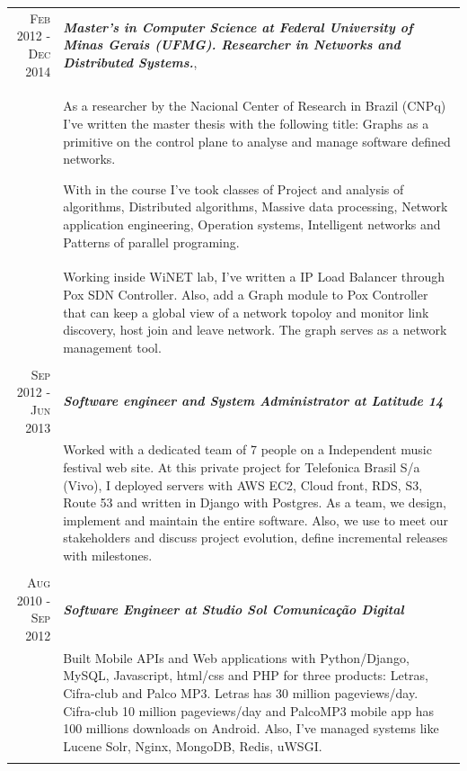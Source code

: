 \documentclass[a4paper,10pt]{article} %
\begin{document}
\begin{longtable}{r|p{11cm}}

\textsc{Feb 2012 - Dec 2014} & \emph{\bf Master's in Computer Science at
Federal University of Minas Gerais (UFMG). Researcher in
Networks and Distributed Systems.}, \\
& \footnotesize{As a researcher by the Nacional Center of Research in Brazil
    (CNPq) I've written the master thesis with the following title: Graphs as
    a primitive on the control plane to analyse and manage software defined
    networks.

    With in the course I've took classes of Project and analysis of algorithms,
    Distributed algorithms, Massive data processing, Network application
    engineering, Operation systems, Intelligent networks and Patterns of
    parallel programing.} \\

& \footnotesize{
    Working inside WiNET lab, I've written a IP Load Balancer through Pox SDN
    Controller. Also, add a Graph module to
    Pox Controller that can keep a global view of a network topoloy and monitor
    link discovery, host join and leave network. The graph serves as a network
    management tool.} \\
\multicolumn{2}{c}{} \\


\textsc{Sep 2012 - Jun 2013} & \emph{\bf Software engineer and System
Administrator at Latitude 14} \\
& \footnotesize{Worked with a dedicated team of 7 people on a Independent
	music festival web site. At this private project for Telefonica Brasil
	S/a (Vivo), I deployed servers with AWS EC2, Cloud front, RDS, S3,
	Route 53 and written in Django with Postgres. As a team, we design,
	implement and maintain the entire software. Also, we use to meet our
	stakeholders and discuss project evolution, define incremental releases
	with milestones.} \\

\multicolumn{2}{c}{} \\


\textsc{Aug 2010 - Sep 2012} & \emph{\bf Software Engineer at Studio Sol
Comunicação Digital}  \\
& \footnotesize{Built Mobile APIs and Web applications with Python/Django,
	MySQL, Javascript, html/css and PHP for three products: Letras, Cifra-club
	and Palco MP3. Letras has 30 million pageviews/day. Cifra-club 10 million
	pageviews/day and PalcoMP3 mobile app has 100 millions downloads on
	Android. Also, I've managed systems like Lucene Solr, Nginx, MongoDB,
	Redis, uWSGI.} \\
\multicolumn{2}{c}{} \\


\end{longtable}
\end{document}
